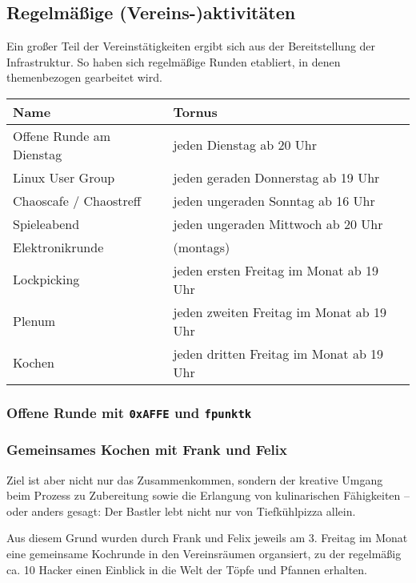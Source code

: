 \documentclass[10pt,DIV16]{scrartcl}
\begin{document}
\subsection{Regelmäßige (Vereins-)aktivitäten}

Ein großer Teil der Vereinstätigkeiten ergibt sich aus der
Bereitstellung der Infrastruktur. So haben sich regelmäßige Runden
etabliert, in denen themenbezogen gearbeitet wird.

\begin{table}[h]
	\begin{tabular}{l|l}
		Name   &  Tornus \\ \hline
		Offene Runde am Dienstag   &  jeden Dienstag ab 20 Uhr\\
		Linux User Group   &  jeden geraden Donnerstag ab 19 Uhr\\
		Chaoscafe / Chaostreff   &  jeden ungeraden Sonntag ab 16 Uhr\\
		Spieleabend   &  jeden ungeraden Mittwoch ab 20 Uhr\\
		Elektronikrunde   &  (montags)\\
		Lockpicking   &  jeden ersten Freitag im Monat ab 19 Uhr\\
		Plenum   &  jeden zweiten Freitag im Monat ab 19 Uhr\\
		Kochen   &  jeden dritten Freitag im Monat ab 19 Uhr\\
\end{tabular}
\end{table}

\subsubsection{Offene Runde mit \texttt{0xAFFE} und \texttt{fpunktk}}

\subsubsection{Gemeinsames Kochen mit Frank und Felix}

Ziel ist aber nicht nur das Zusammenkommen, sondern der kreative
Umgang beim Prozess zu Zubereitung sowie die Erlangung von
kulinarischen Fähigkeiten -- oder anders gesagt: Der Bastler lebt
nicht nur von Tiefkühlpizza allein.

Aus diesem Grund wurden durch Frank und Felix jeweils am 3. Freitag
im Monat eine gemeinsame Kochrunde in den Vereinsräumen organsiert,
zu der regelmäßig ca. 10 Hacker einen Einblick in die Welt der Töpfe
und Pfannen erhalten.
\end{document}
